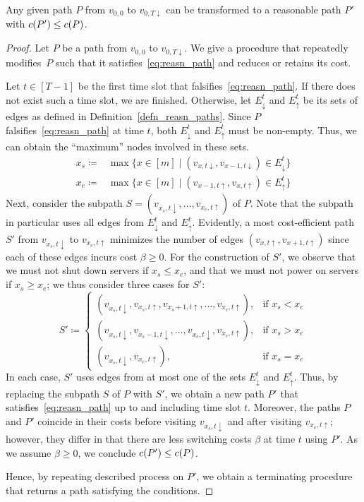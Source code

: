 \begin{prop}\label{prop:path_to_reasn_path}
Any given path $P$ from $v_{0,0}$ to $v_{0,T\downarrow}$ can be transformed to a reasonable path $P'$ with $c(P')\le c(P)$.
\end{prop}
\begin{proof}
Let $P$ be a path from $v_{0,0}$ to $v_{0,T\downarrow}$. We give a procedure that repeatedly modifies~$P$ such that it satisfies~\eqref{eq:reasn_path} and reduces or retains its cost.

Let $t\in[T-1]$ be the first time slot that falsifies~\eqref{eq:reasn_path}. If there does not exist such a time slot, we are finished. Otherwise, let $E_\downarrow^t$ and $E_\uparrow^t$ be its sets of edges as defined in Definition~\ref{defn_reasn_paths}. Since $P$ falsifies~\eqref{eq:reasn_path} at time $t$, both $E_\downarrow^t$ and $E_\uparrow^t$ must be non-empty. Thus, we can obtain the ``maximum'' nodes involved in these sets.
\begin{align*}
	x_s\coloneqq&\max\bigl\{x\in[m]\mid (v_{x,t\downarrow},v_{x-1,t\downarrow})\in E_\downarrow^t\bigr\}\\
	x_e\coloneqq&\max\bigl\{x\in[m]\mid (v_{x-1,t\uparrow},v_{x,t\uparrow})\in E_\uparrow^t\bigr\}
\end{align*}
Next, consider the subpath $S=(v_{x_s,t\downarrow},\dotsc,v_{x_e,t\uparrow})$ of $P$. Note that the subpath in particular uses all edges from $E_\downarrow^t$ and $E_\uparrow^t$.
Evidently, a most cost-efficient path $S'$ from $v_{x_s,t\downarrow}$ to $v_{x_e,t\uparrow}$ minimizes the number of edges $(v_{x,t\uparrow},v_{x+1,t\uparrow})$ since each of these edges incurs cost $\beta\ge 0$. For the construction of $S'$, we observe that we must not shut down servers if $x_s\le x_e$, and that we must not power on servers if $x_s\ge x_e$; we thus consider three cases for $S'$:
\begin{equation*}
	S'\coloneqq
	\begin{cases}
		(v_{x_s,t\downarrow},v_{x_s,t\uparrow},v_{x_s+1,t\uparrow},\dotsc,v_{x_e,t\uparrow}), & \text{if $x_s< x_e$}\\
		(v_{x_s,t\downarrow},v_{x_s-1,t\downarrow},\dotsc,v_{x_e,t\downarrow},v_{x_e,t\uparrow}), & \text{if $x_s>x_e$}\\
		(v_{x_s,t\downarrow},v_{x_e,t\uparrow}), & \text{if $x_s=x_e$}
	\end{cases}
\end{equation*}
In each case, $S'$ uses edges from at most one of the sets $E_\downarrow^t$ and $E_\uparrow^t$. Thus, by replacing the subpath $S$ of $P$ with $S'$, we obtain a new path $P'$ that satisfies~\eqref{eq:reasn_path} up to and including time slot $t$. Moreover, the paths $P$ and $P'$ coincide in their costs before visiting $v_{x_s,t\downarrow}$ and after visiting $v_{x_e,t\uparrow}$; however, they differ in that there are less switching costs $\beta$ at time $t$ using $P'$. As we assume $\beta\ge0$, we conclude $c(P')\le c(P)$.

Hence, by repeating described process on $P'$, we obtain a terminating procedure that returns a path satisfying the conditions.
\end{proof}
